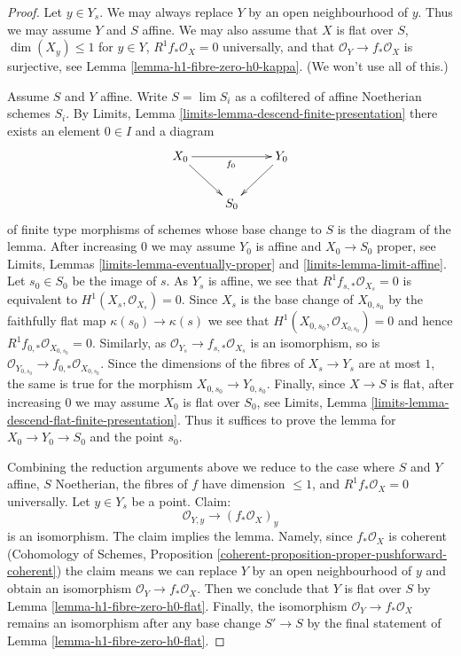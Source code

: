 \documentclass[10pt,a4paper]{amsart}
\theoremstyle{plain}
\theoremstyle{definition}
\theoremstyle{remark}
\numberwithin{equation}{subsection}
\def\lim{\mathop{\mathrm{lim}}\nolimits}
\begin{document}
\begin{proof}
Let $y \in Y_s$. We may always replace $Y$ by an open neighbourhood of $y$.
Thus we may assume $Y$ and $S$ affine. We may also assume that
$X$ is flat over $S$, $\dim(X_y) \leq 1$ for $y \in Y$,
$R^1f_*\mathcal{O}_X = 0$ universally, and that
$\mathcal{O}_Y \to f_*\mathcal{O}_X$ is surjective, see
Lemma \ref{lemma-h1-fibre-zero-h0-kappa}. (We won't use all of this.)

\medskip\noindent
Assume $S$ and $Y$ affine.
Write $S = \lim S_i$ as a cofiltered of affine Noetherian schemes $S_i$.
By Limits, Lemma \ref{limits-lemma-descend-finite-presentation}
there exists an element $0 \in I$ and a diagram
$$
\xymatrix{
X_0 \ar[rr]_{f_0} \ar[rd] & & Y_0 \ar[ld] \\
& S_0
}
$$
of finite type morphisms of schemes whose base change to $S$
is the diagram of the lemma. After increasing $0$ we may assume $Y_0$
is affine and $X_0 \to S_0$ proper, see
Limits, Lemmas \ref{limits-lemma-eventually-proper} and
\ref{limits-lemma-limit-affine}.
Let $s_0 \in S_0$ be the image of $s$.
As $Y_s$ is affine, we see that
$R^1f_{s, *}\mathcal{O}_{X_s} = 0$ is equivalent
to $H^1(X_s, \mathcal{O}_{X_s}) = 0$.
Since $X_s$ is the base change of $X_{0, s_0}$ by
the faithfully flat map $\kappa(s_0) \to \kappa(s)$
we see that $H^1(X_{0, s_0}, \mathcal{O}_{X_{0, s_0}}) = 0$
and hence $R^1f_{0, *}\mathcal{O}_{X_{0, s_0}} = 0$.
Similarly, as $\mathcal{O}_{Y_s} \to f_{s, *}\mathcal{O}_{X_s}$
is an isomorphism, so is
$\mathcal{O}_{Y_{0, s_0}} \to f_{0, *}\mathcal{O}_{X_{0, s_0}}$.
Since the dimensions of the fibres of $X_s \to Y_s$ are at most $1$,
the same is true for the morphism $X_{0, s_0} \to Y_{0, s_0}$.
Finally, since $X \to S$ is flat, after increasing $0$
we may assume $X_0$ is flat over $S_0$, see
Limits, Lemma \ref{limits-lemma-descend-flat-finite-presentation}.
Thus it suffices to prove the lemma for
$X_0 \to Y_0 \to S_0$ and the point $s_0$.

\medskip\noindent
Combining the reduction arguments above we reduce to the case where
$S$ and $Y$ affine, $S$ Noetherian, the fibres of $f$ have dimension
$\leq 1$, and $R^1f_*\mathcal{O}_X = 0$ universally.
Let $y \in Y_s$ be a point. Claim:
$$
\mathcal{O}_{Y, y} \longrightarrow (f_*\mathcal{O}_X)_y
$$
is an isomorphism. The claim implies the lemma. Namely, since
$f_*\mathcal{O}_X$ is coherent (Cohomology of Schemes, Proposition
\ref{coherent-proposition-proper-pushforward-coherent})
the claim means we can replace $Y$ by an open neighbourhood of $y$
and obtain an isomorphism $\mathcal{O}_Y \to f_*\mathcal{O}_X$.
Then we conclude that $Y$ is flat over $S$
by Lemma \ref{lemma-h1-fibre-zero-h0-flat}.
Finally, the isomorphism $\mathcal{O}_Y \to f_*\mathcal{O}_X$
remains an isomorphism after any base change $S' \to S$
by the final statement of Lemma \ref{lemma-h1-fibre-zero-h0-flat}.


\end{proof}
\end{document}
